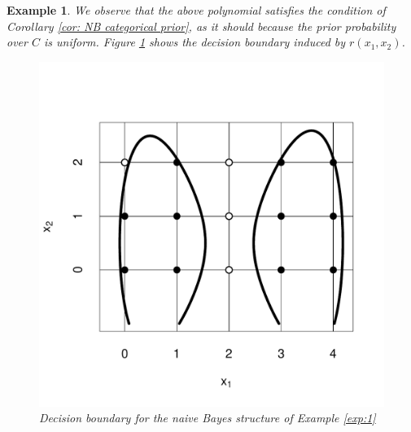 \documentclass[11pt,a4paper, twoside]{book}
\newtheorem{example}{Example}[chapter]
\begin{document}
\begin{example}
We observe that the above polynomial satisfies the condition of {Corollary} \ref{cor: NB categorical prior}, as it should because the prior probability over $C$ is uniform. 
Figure \ref{fig:exp1} shows the decision boundary induced by $r(x_1,x_2)$.
\begin{figure}
\centering
\includegraphics[scale=0.65]{nbexample}
\caption{Decision boundary for the naive Bayes structure of Example \ref{exp:1}}
\label{fig:exp1}
\end{figure}
\end{example}
\end{document}
